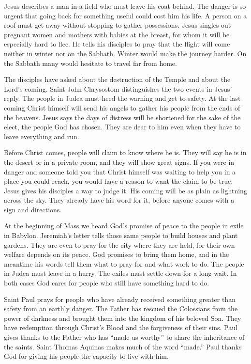 Jesus describes a man in a field who must leave his coat behind. The danger
is so urgent that going back for something useful could cost him his life.
A person on a roof must get away without stopping to gather possessions.
Jesus singles out pregnant women and mothers with babies at the breast,
for whom it will be especially hard to flee. He tells his disciples to pray
that the flight will come neither in winter nor on the Sabbath.
Winter would make the journey harder. On the Sabbath many would
hesitate to travel far from home.

The disciples have asked about the destruction of the Temple and about the
Lord's coming. Saint John Chrysostom distinguishes the two events in Jesus'
reply. The people in Judea must heed the warning and get to safety.
At the last coming Christ himself will send his angels to gather his people
from the ends of the heavens. Jesus says the days of distress will be
shortened for the sake of the elect, the people God has chosen.
They are dear to him even when they have to leave everything and run.

Before Christ comes, people will claim to know where he is. They will say he
is in the desert or in a private room, and they will show great signs. If you
were in danger and someone told you that Christ himself was waiting to help
you in a place you could reach, you would have a reason to want the claim to
be true. Jesus gives his disciples a way to judge it. His coming will be as
plain as lightning across the sky. They already have his word for it, before
anyone comes with a sign and directions.

At the beginning of Mass we heard God's promise of peace to the people in
exile in Babylon. Jeremiah's letter tells those same people to build houses
and plant gardens. They are even to pray for the city where they are held,
for their own welfare depends on its peace. God promises to bring them home,
and in the meantime his words tell them what to pray for and what work to do.
The people in Judea must leave in a hurry. The exiles must settle down for a
long wait. In both cases God cares for people who still have something hard
to do.

Saint Paul prays for people who have already received something greater than
safety from an earthly danger. The Father has rescued the Colossians from the
power of darkness and brought them into the kingdom of his beloved Son. They
have redemption through Christ's Blood and the forgiveness of their sins.
Paul gives thanks to the Father who has ``made us worthy'' to share the
inheritance of the saints. Saint Thomas Aquinas makes much of the word
``made.'' Paul thanks God for giving his people the capacity to live with him.

